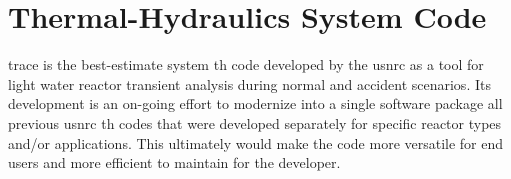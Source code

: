 \section{Thermal-Hydraulics System Code }\label{sec:reflood_trace}

\gls{trace} is the best-estimate system \gls{th} code developed by the \gls{usnrc} 
as a tool for light water reactor transient analysis during normal and accident scenarios.
Its development is an on-going effort 
to modernize into a single software package all previous \gls{usnrc} \gls{th} codes
that were developed separately for specific reactor types and/or applications.
This ultimately would make the code more versatile for end users and more efficient to maintain for the developer.